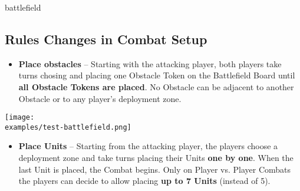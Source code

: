 \begin{expansion}{battlefield}
\begin{multicols*}{2}
  \subsection*{Rules Changes in Combat Setup}
  \begin{itemize}
   \item \textbf{Place obstacles} – Starting with the attacking player, both players take turns chosing and placing one Obstacle Token on the Battlefield Board until \textbf{all Obstacle Tokens are placed}. No Obstacle can be adjacent to another Obstacle or to any player's deployment zone.
  \end{itemize}
    \texttt{[image: \\examples/test-battlefield.png]}
  \begin{itemize}
    \item \textbf{Place Units}  – Starting from the attacking player, the players choose a deployment zone and take turns placing their Units \textbf{one by one}.
    When the last Unit is placed, the Combat begins.
    Only on Player vs. Player Combats the players can decide to allow placing \textbf{up to 7 Units} (instead of 5).
  \end{itemize}
  \end{multicols*}
\end{expansion}

